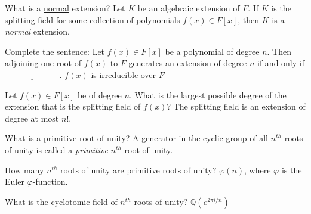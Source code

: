 \documentclass[avery5371,grid]{flashcards}
\newcommand{\Q}{\mathbb{Q}}
\newcommand{\blank}{$\; \underline{\hspace{1in}} \; $}
\let \phi \varphi
\begin{document}
\begin{flashcard}[Fields]{What is a \underline{normal} extension?}
 Let $K$ be an algebraic extension of $F$. If $K$ is the splitting field for some collection of polynomials  $f(x) \in F[x]$, then $K$ is a \emph{normal} extension.
\end{flashcard}

\begin{flashcard}[Fields]{Complete the sentence: Let $f(x) \in F[x]$ be a polynomial of degree $n$. Then adjoining one root of $f(x)$ to $F$ generates an extension of degree $n$ if and only if \blank .}
 $f(x)$ is irreducible over $F$
\end{flashcard}

\begin{flashcard}[Fields]{Let $f(x) \in F[x]$ be of degree $n$. What is the largest possible degree of the extension that is the splitting field of $f(x)$?}
 The splitting field is an extension of degree at most $n!$.
\end{flashcard}

\begin{flashcard}[Fields]{What is a \underline{primitive} root of unity?}
 A generator in the cyclic group of all $n^{th}$ roots of unity is called a \emph{primitive} $n^{th}$ root of unity.
\end{flashcard}

\begin{flashcard}[Fields]{How many $n^{th}$ roots of unity are primitive roots of unity?}
 $\phi(n)$, where $\phi$ is the Euler $\phi$-function.
\end{flashcard}

\begin{flashcard}[Fields]{What is the \underline{cyclotomic field of $n^{th}$ roots of unity}?}
 $\Q(e^{2 \pi i/n})$
\end{flashcard}
\end{document}
